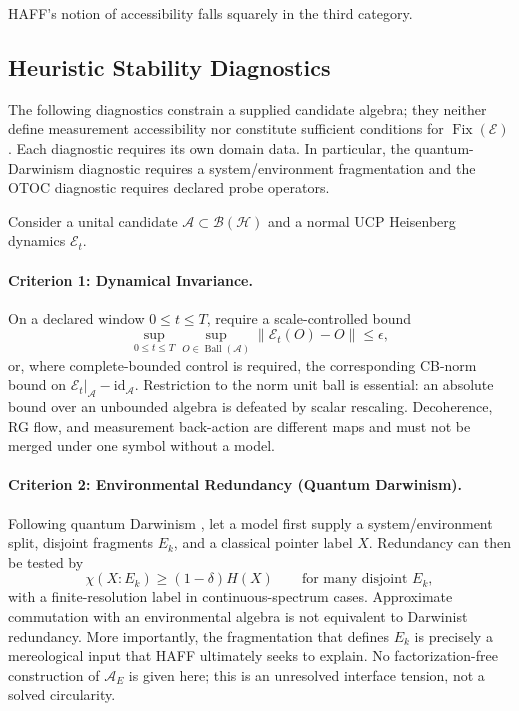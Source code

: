 \documentclass[12pt,a4paper]{article}
\begin{document}
HAFF's notion of accessibility falls squarely in the third category.

\subsection{Heuristic Stability Diagnostics}

The following diagnostics constrain a supplied candidate algebra; they neither define measurement accessibility nor constitute sufficient conditions for $\operatorname{Fix}(\mathcal E)$.  Each diagnostic requires its own domain data.  In particular, the quantum-Darwinism diagnostic requires a system/environment fragmentation and the OTOC diagnostic requires declared probe operators.

Consider a unital candidate $\mathcal A\subset\mathcal B(\mathcal H)$ and a normal UCP Heisenberg dynamics $\mathcal E_t$.

\paragraph{Criterion 1: Dynamical Invariance.}
On a declared window $0\le t\le T$, require a scale-controlled bound
\begin{equation}
\sup_{0\le t\le T}
\sup_{O\in\operatorname{Ball}(\mathcal A)}
\|\mathcal E_t(O)-O\|\le\epsilon,
\end{equation}
or, where complete-bounded control is required, the corresponding CB-norm bound on $\mathcal E_t|_{\mathcal A}-\mathrm{id}_{\mathcal A}$.  Restriction to the norm unit ball is essential: an absolute bound over an unbounded algebra is defeated by scalar rescaling.  Decoherence, RG flow, and measurement back-action are different maps and must not be merged under one symbol without a model.

\paragraph{Criterion 2: Environmental Redundancy (Quantum Darwinism).}
Following quantum Darwinism \cite{Zurek2009}, let a model first supply a system/environment split, disjoint fragments $E_k$, and a classical pointer label $X$.  Redundancy can then be tested by
\begin{equation}
\chi(X:E_k)\ge(1-\delta)H(X)
\qquad\text{for many disjoint }E_k,
\end{equation}
with a finite-resolution label in continuous-spectrum cases.  Approximate commutation with an environmental algebra is not equivalent to Darwinist redundancy.  More importantly, the fragmentation that defines $E_k$ is precisely a mereological input that HAFF ultimately seeks to explain.  No factorization-free construction of $\mathcal A_E$ is given here; this is an unresolved interface tension, not a solved circularity.
\end{document}
